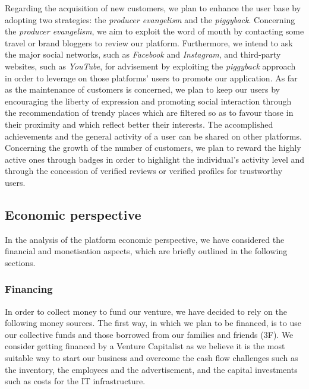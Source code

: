 \documentclass[letterpaper, 11pt]{Proposal}
\begin{document}
Regarding the acquisition of new customers, we plan to enhance the user base by adopting two strategies: the \emph{producer evangelism} and the \emph{piggyback}. Concerning the \emph{producer evangelism}, we aim to exploit the word of mouth by contacting some travel or brand bloggers to review our platform. Furthermore, we intend to ask the major social networks, such as \emph{Facebook} and \emph{Instagram}, and third-party websites, such as \emph{YouTube}, for advisement by exploiting the \emph{piggyback} approach in order to leverage on those platforms' users to promote our application.
As far as the maintenance of customers is concerned, we plan to keep our users by encouraging the liberty of expression and promoting social interaction through the recommendation of trendy places which are filtered so as to favour those in their proximity and which reflect better their interests.
The accomplished achievements and the general activity of a user can be shared on other platforms.
Concerning the growth of the number of customers, we plan to reward the highly active ones through badges in order to highlight the individual’s activity level and through the concession of verified reviews or verified profiles for trustworthy users.

\subsection{Economic perspective}\label{subsec:usrsAndMon_monetization}
In the analysis of the platform economic perspective, we have considered the financial and monetisation aspects, which are briefly outlined in the following sections.

\subsubsection{Financing}
In order to collect money to fund our venture, we have decided to rely on the following money sources. The first way, in which we plan to be financed, is to use our collective funds and those borrowed from our families and friends (3F). We consider getting financed by a Venture Capitalist as we believe it is the most suitable way to start our business and overcome the cash flow challenges such as the inventory, the employees and the advertisement, and the capital investments such as costs for the IT infrastructure. 
\end{document}
